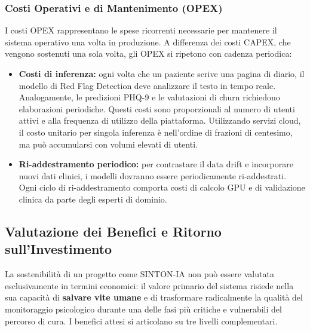 \subsubsection{Costi Operativi e di Mantenimento (OPEX)}
\label{subsubsec:opex}

I costi OPEX rappresentano le spese ricorrenti necessarie per mantenere il sistema operativo una volta in produzione. A differenza dei costi CAPEX, che vengono sostenuti una sola volta, gli OPEX si ripetono con cadenza periodica:

\begin{itemize}
    \item \textbf{Costi di inferenza:} ogni volta che un paziente scrive una pagina di diario, il modello di Red Flag Detection deve analizzare il testo in tempo reale. Analogamente, le predizioni PHQ-9 e le valutazioni di churn richiedono elaborazioni periodiche. Questi costi sono proporzionali al numero di utenti attivi e alla frequenza di utilizzo della piattaforma. Utilizzando servizi cloud, il costo unitario per singola inferenza è nell'ordine di frazioni di centesimo, ma può accumularsi con volumi elevati di utenti.


    \item \textbf{Ri-addestramento periodico:} per contrastare il data drift e incorporare nuovi dati clinici, i modelli dovranno essere periodicamente ri-addestrati. Ogni ciclo di ri-addestramento comporta costi di calcolo GPU e di validazione clinica da parte degli esperti di dominio.
\end{itemize}

\clearpage
\subsection{Valutazione dei Benefici e Ritorno sull'Investimento}
\label{subsec:benefici_roi}

La sostenibilità di un progetto come SINTON-IA non può essere valutata esclusivamente in termini economici: il valore primario del sistema risiede nella sua capacità di \textbf{salvare vite umane} e di trasformare radicalmente la qualità del monitoraggio psicologico durante una delle fasi più critiche e vulnerabili del percorso di cura. I benefici attesi si articolano su tre livelli complementari.

